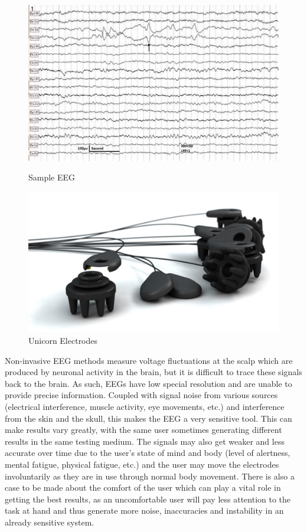 \begin{figure}[H]
    \begin{minipage}[c]{0.45\linewidth}
      \includegraphics[width=\linewidth]{Graphics/EEG Example.jpeg}
      \caption{Sample EEG}
      \end{minipage}
    \hfill
    \begin{minipage}[c]{0.45\linewidth}
      \includegraphics[width=\linewidth]{Graphics/Unicorn Electrodes.jpg}
      \caption{Unicorn Electrodes}
  \end{minipage}%
\end{figure}

Non-invasive EEG methods measure voltage fluctuations at the scalp which are produced by neuronal activity in the brain, but it is difficult to trace these signals back to the brain. As such, EEGs have low special resolution and are unable to provide precise information. Coupled with signal noise from various sources (electrical interference, muscle activity, eye movements, etc.) and interference from the skin and the skull, this makes the EEG a very sensitive tool. This can make results vary greatly, with the same user sometimes generating different results in the same testing medium. The signals may also get weaker and less accurate over time due to the user's state of mind and body (level of alertness, mental fatigue, physical fatigue, etc.) and the user may move the electrodes involuntarily as they are in use through normal body movement. There is also a case to be made about the comfort of the user which can play a vital role in getting the best results, as an uncomfortable user will pay less attention to the task at hand and thus generate more noise, inaccuracies and instability in an already sensitive system.


